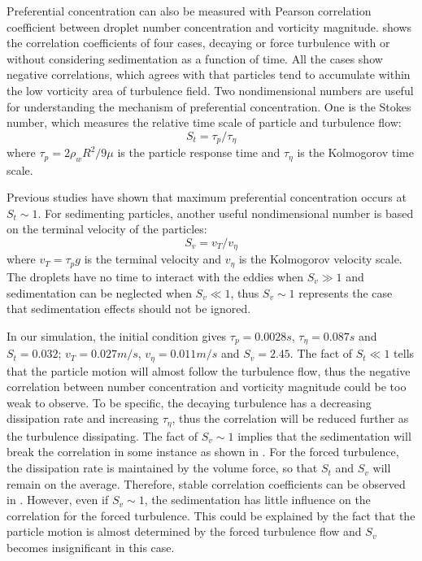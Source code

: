 Preferential concentration can also be measured with Pearson correlation
coefficient between droplet number concentration and vorticity magnitude.
 shows the correlation coefficients of four cases,
decaying or force turbulence with or without considering sedimentation as a
function of time. All the cases show negative correlations, which agrees with
that particles tend to accumulate within the low vorticity area of turbulence
field. Two nondimensional numbers are useful for understanding the mechanism of
preferential concentration. One is the Stokes number, which measures the
relative time scale of particle and turbulence flow:
\begin{equation}
S_t = \tau_p/\tau_{\eta}
\end{equation}
where $\tau_p = 2\rho_wR^2/9\mu$ is the particle response time and
$\tau_{\eta}$ is the Kolmogorov time scale.

Previous studies \cite{Grabowski1999Comments,Vaillancourt2000Review} have shown
that maximum preferential concentration occurs at $S_t \sim 1$. For sedimenting
particles, another useful nondimensional number is based on the terminal
velocity of the particles:
\begin{equation}
S_v = v_T/v_{\eta}
\end{equation}
where $v_T = \tau_p g$ is the terminal velocity and $v_{\eta}$ is the
Kolmogorov velocity scale. The droplets have no time to interact with the
eddies when $S_v \gg 1$ and sedimentation can be neglected when $S_v \ll 1$,
thus $S_v \sim 1$ represents the case that sedimentation effects should not be
ignored.

In our simulation, the initial condition gives $\tau_p = 0.0028 s$, $\tau_\eta
= 0.087s$ and $S_t = 0.032$; $v_T = 0.027 m/s$, $v_{\eta} = 0.011 m/s$ and $S_v
= 2.45$. The fact of $S_t \ll 1$ tells that the particle motion will almost
follow the turbulence flow, thus the negative correlation between number
concentration and vorticity magnitude could be too weak to observe. To be
specific, the decaying turbulence has a decreasing dissipation rate and
increasing $\tau_{\eta}$, thus the correlation will be reduced further as the
turbulence dissipating. The fact of $S_v \sim 1$ implies that the sedimentation
will break the correlation in some instance as shown in .
For the forced turbulence, the dissipation rate is maintained by the volume
force, so that $S_t$ and $S_v$ will remain on the average. Therefore, stable
correlation coefficients can be observed in . However,
even if $S_v \sim 1$, the sedimentation has little influence on the correlation
for the forced turbulence. This could be explained by the fact that the
particle motion is almost determined by the forced turbulence flow and $S_v$
becomes insignificant in this case.


